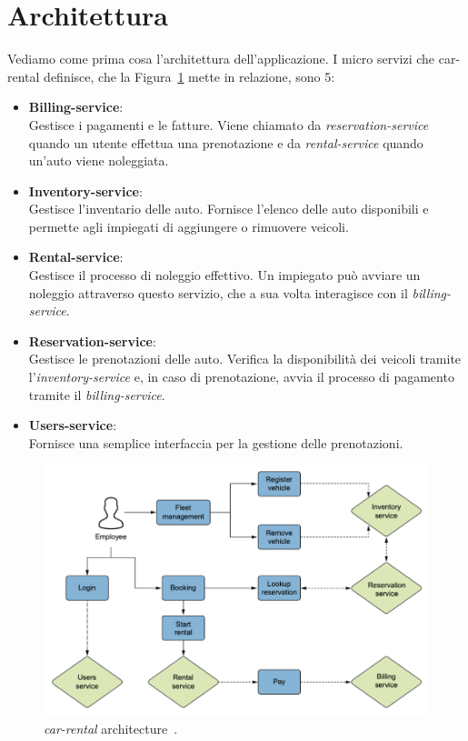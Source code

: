 \section{Architettura}
\label{sec:servizi}
Vediamo come prima cosa l'architettura dell'applicazione. I micro servizi che car-rental definisce, che la Figura~\ref{fig:architecture} mette in relazione, sono 5:
\begin{itemize}
    \item \textbf{Billing-service}: \\
        Gestisce i pagamenti e le fatture. Viene chiamato da \textit{reservation-service} quando un utente effettua una prenotazione e da \textit{rental-service} quando un'auto viene noleggiata.
    \item \textbf{Inventory-service}: \\
        Gestisce l'inventario delle auto. Fornisce l'elenco delle auto disponibili e permette agli impiegati di aggiungere o rimuovere veicoli.
    \item \textbf{Rental-service}: \\
        Gestisce il processo di noleggio effettivo. Un impiegato può avviare un noleggio attraverso questo servizio, che a sua volta interagisce con il \textit{billing-service}.
    \item \textbf{Reservation-service}: \\
        Gestisce le prenotazioni delle auto. Verifica la disponibilità dei veicoli tramite l'\textit{inventory-service} e, in caso di prenotazione, avvia il processo di pagamento tramite il \textit{billing-service}.
    \item \textbf{Users-service}: \\
        Fornisce una semplice interfaccia per la gestione delle prenotazioni.
\end{itemize}

\begin{figure}[htbp]
    \centering
    \includegraphics[width=\textwidth]{images/2-car-rental/architecture.pdf}
    \caption{\textit{car-rental} architecture~\cite{quarkusinaction}.}
    \label{fig:architecture}
\end{figure}

